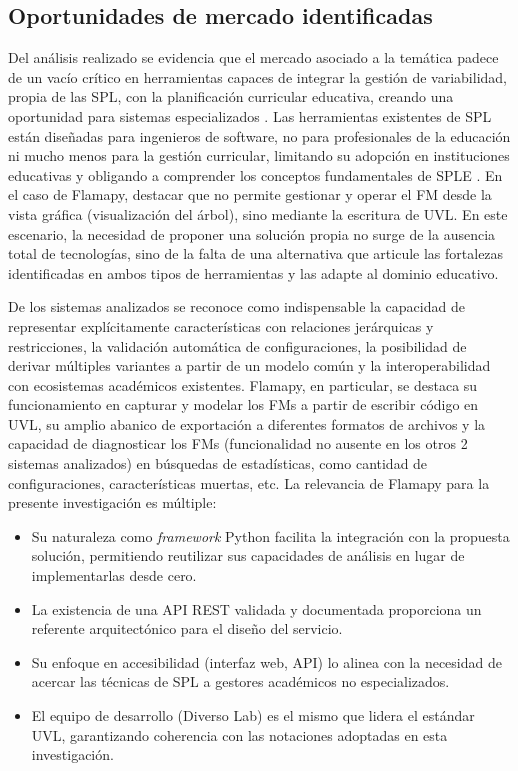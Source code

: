 \subsection{Oportunidades de mercado identificadas}

Del análisis realizado se evidencia que el mercado asociado a la temática 
padece de un vacío crítico en herramientas capaces de integrar la gestión de variabilidad,
propia de las \ac{SPL}, con la planificación curricular educativa, creando una 
oportunidad para sistemas especializados \citep{sanchez2020metodologia}. 
Las herramientas existentes de \ac{SPL} están diseñadas para ingenieros de software, 
no para profesionales de la educación ni mucho menos para la gestión curricular, 
limitando su adopción en instituciones educativas y obligando a comprender los conceptos 
fundamentales de \ac{SPLE} \citep{chen2020variability}. 
En el caso de Flamapy, destacar que no permite gestionar y operar el \ac{FM} 
desde la vista gráfica (visualización del árbol), sino mediante la escritura de \ac{UVL}.
En este escenario, la necesidad de proponer una solución propia no surge de 
la ausencia total de tecnologías, sino de la falta de una alternativa que articule 
las fortalezas identificadas en ambos tipos de herramientas y las adapte al dominio 
educativo. 

De los sistemas analizados se reconoce como indispensable la capacidad de 
representar explícitamente características con relaciones jerárquicas y restricciones, 
la validación automática de configuraciones, la posibilidad de derivar múltiples 
variantes a partir de un modelo común y la interoperabilidad con ecosistemas académicos 
existentes. Flamapy, en particular, se destaca su funcionamiento en capturar y modelar los
\ac{FM}s a partir de escribir código en \ac{UVL}, su amplio abanico de exportación a diferentes
formatos de archivos y la capacidad de diagnosticar los \ac{FM}s 
(funcionalidad no ausente en los otros 2 sistemas analizados) 
en búsquedas de estadísticas, como cantidad de configuraciones, 
características muertas, etc. La relevancia de Flamapy para la presente investigación 
es múltiple:

\begin{itemize}
    \item Su naturaleza como \textit{framework} Python facilita la integración con la propuesta solución, permitiendo reutilizar sus capacidades de análisis en lugar de implementarlas desde cero.
    \item La existencia de una \ac{API} \ac{REST} validada y documentada proporciona un referente arquitectónico para el diseño del servicio.
    \item Su enfoque en accesibilidad (interfaz web, \ac{API}) lo alinea con la necesidad de acercar las técnicas de \ac{SPL} a gestores académicos no especializados.
    \item El equipo de desarrollo (Diverso Lab) es el mismo que lidera el estándar \ac{UVL}, garantizando coherencia con las notaciones adoptadas en esta investigación.
\end{itemize}

